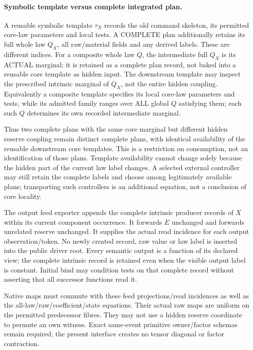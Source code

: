 \documentclass[11pt]{article}
\begin{document}
\paragraph{Symbolic template versus complete integrated plan.}
A reusable symbolic template $\tau_X$ records the old command skeleton, its permitted core-law parameters and local tests. A COMPLETE plan additionally retains its full whole law $Q_X$, all raw/material fields and any derived labels. These are different indices. For a composite whole law $Q$, the intermediate full $Q_X$ is its ACTUAL marginal; it is retained as a complete plan record, not baked into a reusable core template as hidden input. The downstream template may inspect the prescribed intrinsic marginal of $Q_X$, not the entire hidden coupling. Equivalently a composite template specifies its local core-law parameters and tests, while its admitted family ranges over ALL global $Q$ satisfying them; each such $Q$ determines its own recorded intermediate marginal.

Thus two complete plans with the same core marginal but different hidden reserve coupling remain distinct complete plans, with identical availability of the reusable downstream core templates. This is a restriction on consumption, not an identification of those plans. Template availability cannot change solely because the hidden part of the current law label changes. A selected external controller may still retain the complete labels and choose among legitimately available plans; transporting such controllers is an additional equation, not a conclusion of core locality.

The output feed exporter appends the complete intrinsic producer records of $X$ within its current component occurrence. It forwards $E$ unchanged and forwards unrelated reserve unchanged. It supplies the actual read incidence for each output observation/token. No newly created record, raw value or law label is inserted into the public driver root. Every semantic output is a function of its declared view; the complete intrinsic record is retained even when the visible output label is constant. Initial bind may condition tests on that complete record without asserting that all successor functions read it.

Native maps must commute with these feed projections/read incidences as well as the all-law/raw/coefficient/state equations. Their actual raw maps are uniform on the permitted predecessor fibres. They may not use a hidden reserve coordinate to permute an own witness. Exact same-event primitive owner/factor schemas remain required; the present interface creates no tensor diagonal or factor contraction.
\end{document}
